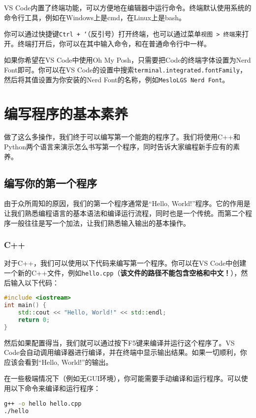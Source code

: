 \documentclass[../main.tex]{subfiles}
\begin{document}
VS Code内置了终端功能，可以方便地在编辑器中运行命令。终端默认使用系统的命令行工具，例如在Windows上是cmd，在Linux上是bash。

你可以通过快捷键\texttt{Ctrl + `}（反引号）打开终端，也可以通过菜单\texttt{视图 > 终端}来打开。终端打开后，你可以在其中输入命令，和在普通命令行中一样。

如果你希望在VS Code中使用Oh My Posh，只需要把Code的终端字体设置为Nerd Font即可。你可以在VS Code的设置中搜索\texttt{terminal.integrated.fontFamily}，然后将其值设置为你安装的Nerd Font的名称，例如\texttt{MesloLGS Nerd Font}。

\section{编写程序的基本素养}

做了这么多操作，我们终于可以编写第一个能跑的程序了。我们将使用C++和Python两个语言来演示怎么书写第一个程序，同时告诉大家编程新手应有的素养。

\subsection{编写你的第一个程序}

由于众所周知的原因，我们的第一个程序通常是“Hello, World!”程序。它的作用是让我们熟悉编程语言的基本语法和编译运行流程，同时也是一个传统。而第二个程序一般往往是写一个加法，让我们熟悉输入输出的基本操作。

\subsubsection{C++}

对于C++，我们可以使用以下代码来编写第一个程序。你可以在VS Code中创建一个新的C++文件，例如\texttt{hello.cpp}（\textbf{该文件的路径不能包含空格和中文！}），然后输入以下代码：

\begin{lstlisting}[language=C++]
#include <iostream>
int main() {
    std::cout << "Hello, World!" << std::endl;
    return 0;
}
\end{lstlisting}

然后如果配置得当，我们就可以通过按下F5键来编译并运行这个程序了。VS Code会自动调用编译器进行编译，并在终端中显示输出结果。如果一切顺利，你应该会看到“Hello, World!”的输出。

在一些极端情况下（例如无GUI环境），你可能需要手动编译和运行程序。可以使用以下命令来编译和运行程序：

\begin{lstlisting}[language=bash]
g++ -o hello hello.cpp
./hello
\end{lstlisting}
\end{document}
